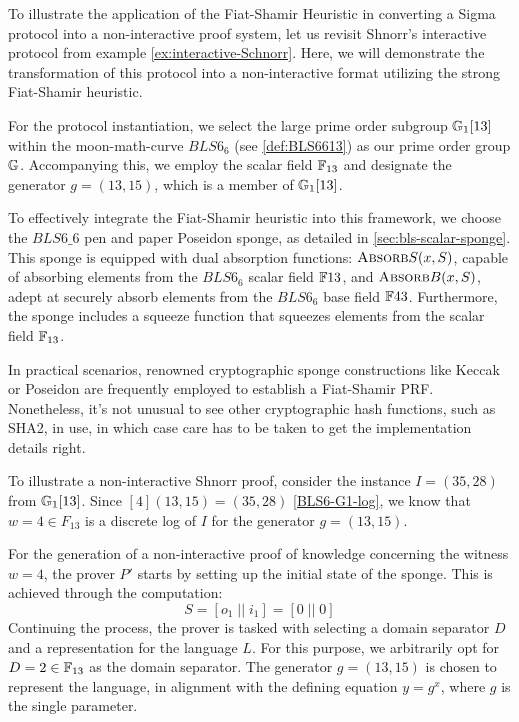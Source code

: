 \begin{example}
\label{ex:Schnorr-SNARK}
To illustrate the application of the Fiat-Shamir Heuristic in converting a Sigma protocol into a non-interactive proof system, let us revisit Shnorr's interactive protocol from example \ref{ex:interactive-Schnorr}. Here, we will demonstrate the transformation of this protocol into a non-interactive format utilizing the strong Fiat-Shamir heuristic.

For the protocol instantiation, we select the large prime order subgroup $\mathbb{G}_1[13]$ within the moon-math-curve $BLS6_6$ (see \ref{def:BLS6613}) as our prime order group $\mathbb{G}$. Accompanying this, we employ the scalar field $\mathbb{F}_{13}$ and designate the generator $g=(13,15)$, which is a member of $\mathbb{G}_1[13]$.

To effectively integrate the Fiat-Shamir heuristic into this framework, we choose the $BLS6\_6$ pen and paper Poseidon sponge, as detailed in \ref{sec:bls-scalar-sponge}. This sponge is equipped with dual absorption functions: $\textsc{Absorb}S(x,S)$, capable of absorbing elements from the $BLS6_6$ scalar field $\mathbb{F}{13}$, and $\textsc{Absorb}B(x,S)$, adept at securely absorb elements from the $BLS6_6$ base field $\mathbb{F}{43}$. Furthermore, the sponge includes a squeeze function that squeezes elements from the scalar field $\mathbb{F}_{13}$.

In practical scenarios, renowned cryptographic sponge constructions like Keccak or Poseidon are frequently employed to establish a Fiat-Shamir PRF. Nonetheless, it's not unusual to see other cryptographic hash functions, such as SHA2, in use, in which case care has to be taken to get the implementation details right. 

To illustrate a non-interactive Shnorr proof, consider the instance $I=(35,28)$ from $\mathbb{G}_1[13]$. Since $[4](13,15)=(35,28)$ \ref{BLS6-G1-log}, we know that $w=4\in F_{13}$ is a discrete log of $I$ for the generator $g=(13,15)$. 

For the generation of a non-interactive proof of knowledge concerning the witness $w=4$, the prover $P'$ starts by setting up the initial state of the sponge. This is achieved through the computation:
$$
S=[o_1\;||\;i_1]=[0\;||\;0]
$$
Continuing the process, the prover is tasked with selecting a domain separator $D$ and a representation for the language $L$. For this purpose, we arbitrarily opt for $D=2 \in \mathbb{F}_{13}$ as the domain separator. The generator $g=(13,15)$ is chosen to represent the language, in alignment with the defining equation $y = g^x$, where $g$ is the single parameter.


\end{example}
